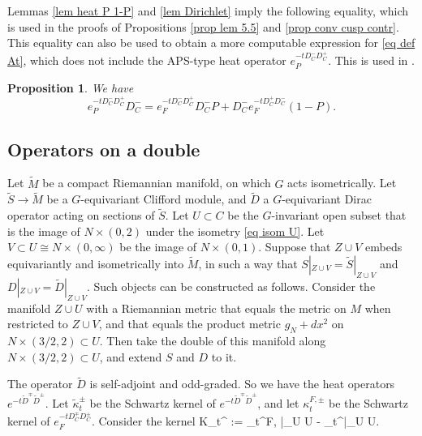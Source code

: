 \documentclass[11pt]{article}
\theoremstyle{plain}
\newtheorem{proposition}[theorem]{Proposition}
\theoremstyle{definition}
\theoremstyle{remark}
\numberwithin{equation}{section}
\begin{document}
Lemmas \ref{lem heat P 1-P} and \ref{lem Dirichlet} imply the following equality, which is used in the proofs of Propositions \ref{prop lem 5.5} and \ref{prop conv cusp contr}. This equality can also be used to obtain a more computable expression for \ref{eq def At}, which does not include the APS-type heat operator $e_P^{-t D_C^- D_C^+}$. This is used in \cite{HW21b}.
\begin{proposition}\label{prop eF eP}
We have
\[
e_P^{-t D_C^- D_C^+}D_C^- = e_F^{-t D_C^- D_C^+}D_C^-P + D_C^-e_F^{-t D_C^+ D_C^-}(1-P).
\]
\end{proposition}


\subsection{Operators on a double}


Let $\tilde M$ be a compact Riemannian manifold, on which $G$ acts isometrically. Let  $\tilde S \to \tilde M$ be a $G$-equivariant Clifford module, and  $\tilde D$ a $G$-equivariant Dirac operator acting on sections of $\tilde S$.
Let $U\subset C$ be the $G$-invariant open subset that is the image of $N \times (0,2)$ under the isometry \eqref{eq isom U}. 
Let $V \subset U \cong N \times (0,\infty)$ be the image of $N \times (0,1)$.
Suppose that
$Z \cup V$
 embeds equivariantly and  isometrically into $\tilde M$, in such a way that $S|_{Z \cup V} = \tilde S|_{Z \cup V}$ and $D|_{Z \cup V} = \tilde D|_{Z \cup V}$. Such objects can be constructed as follows. Consider the manifold $Z \cup U$ with a Riemannian metric that equals the metric on $M$ when restricted to $Z \cup V$, and that equals the product metric $g_N + dx^2$ on $N \times (3/2, 2) \subset U$. Then take the double of this manifold along $N \times (3/2, 2) \subset U$, and extend $S$ and $D$ to it.

The operator $\tilde D$ is self-adjoint and odd-graded. So we have the heat operators  $e^{-t\tilde D^{\mp} \tilde D^{\pm}}$. Let $\tilde \kappa_t^{\pm}$ be the Schwartz kernel of $e^{-t\tilde D^{\mp} \tilde D^{\pm}}$, and
let $\kappa_t^{F, \pm}$ be the Schwartz kernel of $e_F^{-tD_C^{\mp}D_C^{\pm}}$. Consider the kernel
K_t^{\pm} := \kappa_t^{F, \pm}|_{U \times U} - \tilde \kappa_t^{\pm}|_{U \times U}.
\eeq
\end{document}
